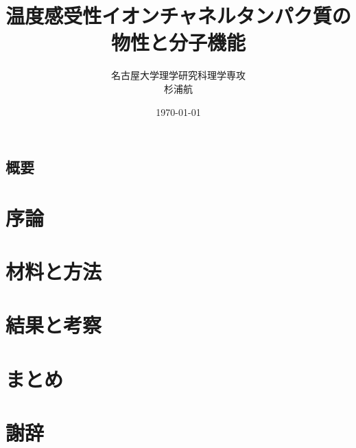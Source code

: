 \documentclass[a4paper, 14pt]{ltjsreport}
\title{温度感受性イオンチャネルタンパク質の物性と分子機能}
\author{名古屋大学理学研究科理学専攻\\杉浦航}
\date{\today}
\begin{document}
\maketitle

\section*{概要}


\tableofcontents
\clearpage

\chapter{序論}


\chapter{材料と方法}\label{chap:methods}


\chapter{結果と考察}


\chapter{まとめ}


\chapter*{謝辞}


\printbibliography[title=参考文献]
\end{document}
